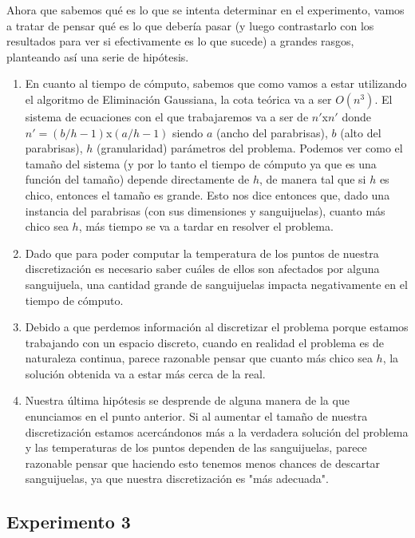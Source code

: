 \newline \par Ahora que sabemos qué es lo que se intenta determinar en el experimento, vamos a tratar de pensar qué es lo que debería pasar (y luego contrastarlo con los resultados para ver si efectivamente es lo que sucede) a grandes rasgos, planteando así una serie de hipótesis. 
\begin{enumerate}
\item En cuanto al tiempo de cómputo, sabemos que como vamos a estar utilizando el algoritmo de Eliminación Gaussiana, la cota teórica va a ser $O(n^3)$. El sistema de ecuaciones con el que trabajaremos va a ser de $n'$x$n'$ donde $n' = (b/h - 1)$x$(a/h - 1)$ siendo $a$ (ancho del parabrisas), $b$ (alto del parabrisas), $h$ (granularidad) parámetros del problema. Podemos ver como el tamaño del sistema (y por lo tanto el tiempo de cómputo ya que es una función del tamaño) depende directamente de $h$, de manera tal que si $h$ es chico, entonces el tamaño es grande. Esto nos dice entonces que, dado una instancia del parabrisas (con sus dimensiones y sanguijuelas), cuanto más chico sea $h$, más tiempo se va a tardar en resolver el problema.
\item Dado que para poder computar la temperatura de los puntos de nuestra discretización es necesario saber cuáles de ellos son afectados por alguna sanguijuela, una cantidad grande de sanguijuelas impacta negativamente en el tiempo de cómputo.
\item Debido a que perdemos información al discretizar el problema porque estamos trabajando con un espacio discreto, cuando en realidad el problema es de naturaleza continua, parece razonable pensar que cuanto más chico sea $h$, la solución obtenida va a estar más cerca de la real.
\item Nuestra última hipótesis se desprende de alguna manera de la que enunciamos en el punto anterior. Si al aumentar el tamaño de nuestra discretización estamos acercándonos más a la verdadera solución del problema y las temperaturas de los puntos dependen de las sanguijuelas, parece razonable pensar que haciendo esto tenemos menos chances de descartar sanguijuelas, ya que nuestra discretización es "más adecuada".
\newline
\par 
\end{enumerate}

\subsection{Experimento 3}

